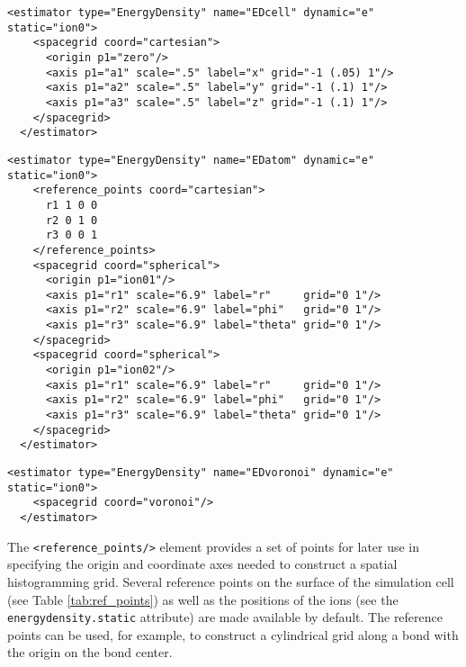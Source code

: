 \begin{lstlisting}[caption=Energy density estimator accumulated on a 20x10x10 grid over the simulation cell.]
  <estimator type="EnergyDensity" name="EDcell" dynamic="e" static="ion0">
    <spacegrid coord="cartesian">
      <origin p1="zero"/>
      <axis p1="a1" scale=".5" label="x" grid="-1 (.05) 1"/>
      <axis p1="a2" scale=".5" label="y" grid="-1 (.1) 1"/>
      <axis p1="a3" scale=".5" label="z" grid="-1 (.1) 1"/>
    </spacegrid>
  </estimator>
\end{lstlisting}


\begin{lstlisting}[caption=Energy density estimator accumulated within spheres of radius 6.9 Bohr centered on the first and second atoms in the ion0 particleset.]
  <estimator type="EnergyDensity" name="EDatom" dynamic="e" static="ion0">
    <reference_points coord="cartesian">
      r1 1 0 0 
      r2 0 1 0
      r3 0 0 1
    </reference_points>
    <spacegrid coord="spherical">
      <origin p1="ion01"/>
      <axis p1="r1" scale="6.9" label="r"     grid="0 1"/>
      <axis p1="r2" scale="6.9" label="phi"   grid="0 1"/>
      <axis p1="r3" scale="6.9" label="theta" grid="0 1"/>
    </spacegrid>
    <spacegrid coord="spherical">
      <origin p1="ion02"/>
      <axis p1="r1" scale="6.9" label="r"     grid="0 1"/>
      <axis p1="r2" scale="6.9" label="phi"   grid="0 1"/>
      <axis p1="r3" scale="6.9" label="theta" grid="0 1"/>
    </spacegrid>
  </estimator>
\end{lstlisting}


\begin{lstlisting}[caption=Energy density estimator accumulated within Voronoi polyhedra centered on the ions.]
  <estimator type="EnergyDensity" name="EDvoronoi" dynamic="e" static="ion0">
    <spacegrid coord="voronoi"/>
  </estimator>
\end{lstlisting}



The \texttt{<reference\_points/>} element provides a set of points for later use in specifying the origin and coordinate axes needed to construct a spatial histogramming grid.  Several reference points on the surface of the simulation cell (see Table \ref{tab:ref_points}) as well as the positions of the ions (see the \texttt{energydensity.static} attribute) are made available by default.  The reference points can be used, for example, to construct a cylindrical grid along a bond with the origin on the bond center. 

